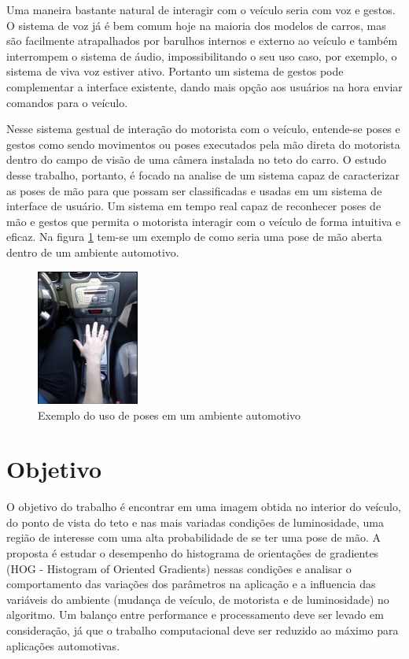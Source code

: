 Uma maneira bastante natural de interagir com o veículo seria com voz e gestos. O sistema de voz já é bem comum hoje na maioria dos modelos de carros, mas são facilmente atrapalhados por barulhos internos e externo ao veículo e também interrompem o sistema de áudio, impossibilitando o seu uso caso, por exemplo, o sistema de viva voz estiver ativo. Portanto um sistema de gestos pode complementar a interface existente, dando mais opção aos usuários na hora enviar comandos para o veículo.

Nesse sistema gestual de interação do motorista com o veículo, entende-se poses e gestos como sendo movimentos ou poses executados pela mão direta do motorista dentro do campo de visão de uma câmera instalada no teto do carro.
O estudo desse trabalho, portanto, é focado na analise de um sistema capaz de caracterizar as poses de mão para que possam ser classificadas e usadas em um sistema de interface de usuário. Um sistema em tempo real capaz de reconhecer poses de mão e gestos que permita o motorista interagir com o veículo de forma intuitiva e eficaz. Na figura \ref{fig:visao_aplicacao} tem-se um exemplo de como seria uma pose de mão aberta dentro de um ambiente automotivo.

\begin{figure}[ht!]
	\centering
	\includegraphics[width=0.3\textwidth]{image/exemplo_visao_aplicacao.png}
	\caption{Exemplo do uso de poses em um ambiente automotivo}
	\label{fig:visao_aplicacao}
\end{figure}

\section{Objetivo}

O objetivo do trabalho é encontrar em uma imagem obtida no interior do veículo, do ponto de vista do teto e nas mais variadas condições de luminosidade, uma região de interesse com uma alta probabilidade de se ter uma pose de mão. A proposta é estudar o desempenho do histograma de orientações de gradientes (HOG - Histogram of Oriented Gradients) nessas condições e analisar o comportamento das variações dos parâmetros na aplicação e a influencia das variáveis do ambiente (mudança de veículo, de motorista e de luminosidade) no algoritmo.
Um balanço entre performance e processamento deve ser levado em consideração, já que o trabalho computacional deve ser reduzido ao máximo para aplicações automotivas.

